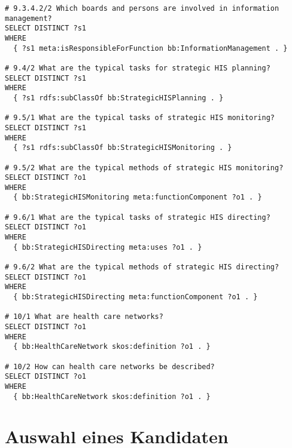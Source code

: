 \begin{lstlisting}[language=SPARQL]
# 9.3.4.2/2 Which boards and persons are involved in information management?
SELECT DISTINCT ?s1
WHERE
  { ?s1 meta:isResponsibleForFunction bb:InformationManagement . }

# 9.4/2 What are the typical tasks for strategic HIS planning?
SELECT DISTINCT ?s1
WHERE
  { ?s1 rdfs:subClassOf bb:StrategicHISPlanning . }

# 9.5/1 What are the typical tasks of strategic HIS monitoring?
SELECT DISTINCT ?s1
WHERE
  { ?s1 rdfs:subClassOf bb:StrategicHISMonitoring . }

# 9.5/2 What are the typical methods of strategic HIS monitoring?
SELECT DISTINCT ?o1
WHERE
  { bb:StrategicHISMonitoring meta:functionComponent ?o1 . }

# 9.6/1 What are the typical tasks of strategic HIS directing?
SELECT DISTINCT ?o1
WHERE
  { bb:StrategicHISDirecting meta:uses ?o1 . }

# 9.6/2 What are the typical methods of strategic HIS directing?
SELECT DISTINCT ?o1
WHERE
  { bb:StrategicHISDirecting meta:functionComponent ?o1 . }

# 10/1 What are health care networks?
SELECT DISTINCT ?o1
WHERE
  { bb:HealthCareNetwork skos:definition ?o1 . }

# 10/2 How can health care networks be described?
SELECT DISTINCT ?o1
WHERE
  { bb:HealthCareNetwork skos:definition ?o1 . }

\end{lstlisting}

\section{Auswahl eines Kandidaten}

